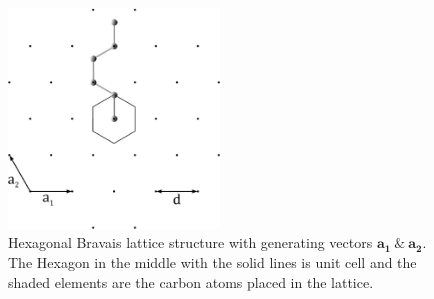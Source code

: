 \begin{figure}
  \centering
  \includegraphics[width=0.5\textwidth]{Figures/hexagon2.eps}
  \caption{Hexagonal Bravais lattice structure with generating vectors $\mathbf{a_{1}} \ \& \ \mathbf{a_{2}}$. The Hexagon in the middle with the solid lines is unit cell and the shaded elements are the carbon atoms placed in the lattice.}
  \label{hexagon}
\end{figure}

\subsubsection{}

